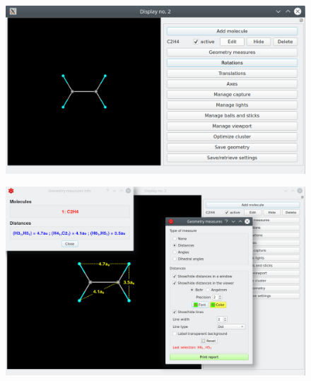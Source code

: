 \documentclass[a4paper,10pt]{article}
\begin{document}
\begin{minipage}{.5\linewidth}
\begin{figure}[H]
\caption{\label{fig:39}}
\begin{center}
\includegraphics[width=0.95\linewidth]{damqt_QS_fig39.png}
\end{center}
\end{figure} 
\end{minipage}
\begin{minipage}{.5\linewidth}
\begin{figure}[H]
\caption{\label{fig:40}}
\begin{center}
\includegraphics[width=0.95\linewidth]{damqt_QS_fig40.png}
\end{center}
\end{figure} 
\end{minipage}
\end{document}
